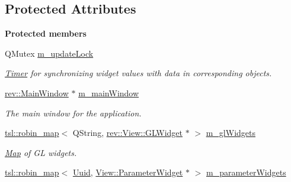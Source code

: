 \subsection*{Protected Attributes}
\begin{Indent}\textbf{ Protected members}\par
\begin{DoxyCompactItemize}
\item 
\mbox{\label{classrev_1_1_view_1_1_widget_manager_ae621863e07aa3836228622856e02a9f2}} 
Q\+Mutex \mbox{\hyperlink{classrev_1_1_view_1_1_widget_manager_ae621863e07aa3836228622856e02a9f2}{m\+\_\+update\+Lock}}
\begin{DoxyCompactList}\small\item\em \mbox{\hyperlink{classrev_1_1_timer}{Timer}} for synchronizing widget values with data in corresponding objects. \end{DoxyCompactList}\item 
\mbox{\label{classrev_1_1_view_1_1_widget_manager_a889d39f4ba69a5d2c64526d239a42473}} 
\mbox{\hyperlink{classrev_1_1_main_window}{rev\+::\+Main\+Window}} $\ast$ \mbox{\hyperlink{classrev_1_1_view_1_1_widget_manager_a889d39f4ba69a5d2c64526d239a42473}{m\+\_\+main\+Window}}
\begin{DoxyCompactList}\small\item\em The main window for the application. \end{DoxyCompactList}\item 
\mbox{\label{classrev_1_1_view_1_1_widget_manager_aa20ef0f2ae4d4405d1dea357f0fac1a7}} 
\mbox{\hyperlink{classtsl_1_1robin__map}{tsl\+::robin\+\_\+map}}$<$ Q\+String, \mbox{\hyperlink{classrev_1_1_view_1_1_g_l_widget}{rev\+::\+View\+::\+G\+L\+Widget}} $\ast$ $>$ \mbox{\hyperlink{classrev_1_1_view_1_1_widget_manager_aa20ef0f2ae4d4405d1dea357f0fac1a7}{m\+\_\+gl\+Widgets}}
\begin{DoxyCompactList}\small\item\em \mbox{\hyperlink{classrev_1_1_map}{Map}} of GL widgets. \end{DoxyCompactList}\item 
\mbox{\label{classrev_1_1_view_1_1_widget_manager_a1200a3af31ac5d04f350b316ec1d9160}} 
\mbox{\hyperlink{classtsl_1_1robin__map}{tsl\+::robin\+\_\+map}}$<$ \mbox{\hyperlink{classrev_1_1_uuid}{Uuid}}, \mbox{\hyperlink{classrev_1_1_view_1_1_parameter_widget}{View\+::\+Parameter\+Widget}} $\ast$ $>$ \mbox{\hyperlink{classrev_1_1_view_1_1_widget_manager_a1200a3af31ac5d04f350b316ec1d9160}{m\+\_\+parameter\+Widgets}}

\end{DoxyCompactItemize}
\end{Indent}
